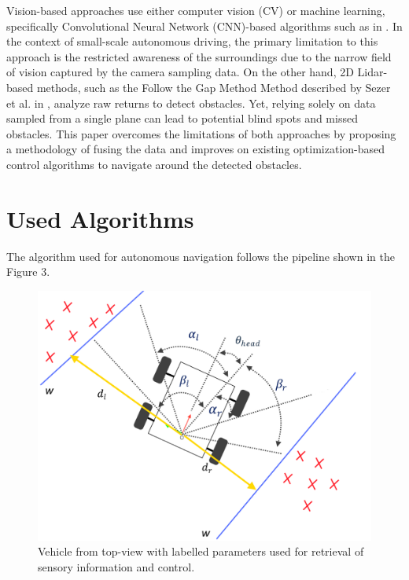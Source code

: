 \documentclass[conference]{IEEEtran}
\begin{document}
Vision-based approaches use either computer vision (CV) or machine learning, specifically Convolutional Neural Network (CNN)-based algorithms such as in \cite{b3}. In the context of small-scale autonomous driving, the primary limitation to this approach is the restricted awareness of the surroundings due to the narrow field of vision captured by the camera sampling data. On the other hand, 2D Lidar-based methods, such as the Follow the Gap Method Method described by Sezer et al. in \cite{b4}, analyze raw returns to detect obstacles. Yet, relying solely on data sampled from a single plane can lead to potential blind spots and missed obstacles. This paper overcomes the limitations of both approaches by proposing a methodology of fusing the data and improves on existing optimization-based control algorithms to navigate around the detected obstacles.

\section{Used Algorithms}
The algorithm used for autonomous navigation follows the pipeline shown in the Figure 3.   

\begin{figure}
    \centering
    \includegraphics[scale=0.2]{diagram.png}
    \caption{Vehicle from top-view with labelled parameters used for retrieval of sensory information and control.}
    \label{Figure 3}
\end{figure}
\end{document}
